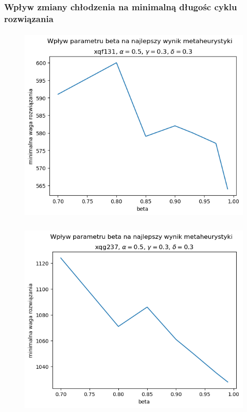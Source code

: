\documentclass{article}
\begin{document}
\subsubsection{Wpływ zmiany chłodzenia na minimalną długośc cyklu rozwiązania}
    \begin{figure}[h!]
        \centering
        \includegraphics[height=9.5cm]{../../plots/sa-tuning-beta-min-xqf131.png}
    \end{figure}
    
    \begin{figure}[h!]
        \centering
        \includegraphics[height=9.5cm]{../../plots/sa-tuning-beta-min-xqg237.png}
    \end{figure}

\newpage
\end{document}
